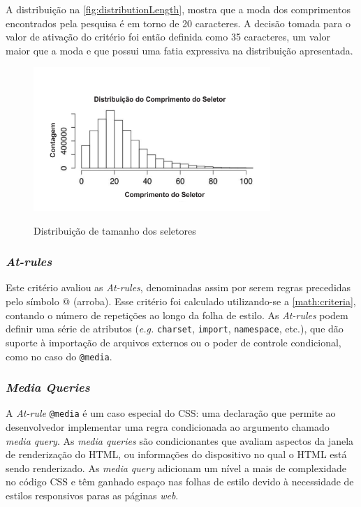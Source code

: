 A distribuição na \autoref{fig:distributionLength}, mostra que a moda dos comprimentos encontrados pela pesquisa é em torno de 20 caracteres. A decisão tomada para o valor de ativação do critério foi então definida como 35 caracteres, um valor maior que a moda e que possui uma fatia expressiva na distribuição apresentada.


\begin{figure}[!htb]
	\centering
	\caption{Distribuição de tamanho dos seletores}
	\includegraphics[width=0.8\textwidth]{./04-figuras/dist_selectorL}
	\label{fig:distributionLength}
\end{figure}

\subsubsection{\textit{At-rules}}
Este critério avaliou as \textit{At-rules}, denominadas assim por serem regras precedidas pelo símbolo @ (arroba). Esse critério foi calculado utilizando-se a \autoref{math:criteria}, contando o número de repetições ao longo da folha de estilo. As \textit{At-rules} podem definir uma série de atributos (\textit{e.g.} \texttt{charset}, \texttt{import}, \texttt{namespace}, etc.), que dão suporte à importação de arquivos externos ou o poder de controle condicional, como no caso do \texttt{@media}.

\subsubsection{\textit{Media Queries}}
A \textit{At-rule} \texttt{@media} é um caso especial do CSS: uma declaração que permite ao desenvolvedor implementar uma regra condicionada ao argumento chamado \textit{media query}. As \textit{media queries} são condicionantes que avaliam aspectos da janela de renderização do HTML, ou informações do dispositivo no qual o HTML está sendo renderizado. As \textit{media query} adicionam um nível a mais de complexidade no código CSS e têm ganhado espaço nas folhas de estilo devido à necessidade de estilos responsivos paras as páginas \textit{web}. 

